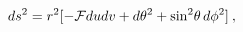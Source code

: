 \begin{equation}
 d s^2 = r^2 [-{\cal F}dudv+
 d\theta^2 + \sin^2\!\theta \, d\phi^2]\:,
 \label{A.1.1}
 \end{equation}


